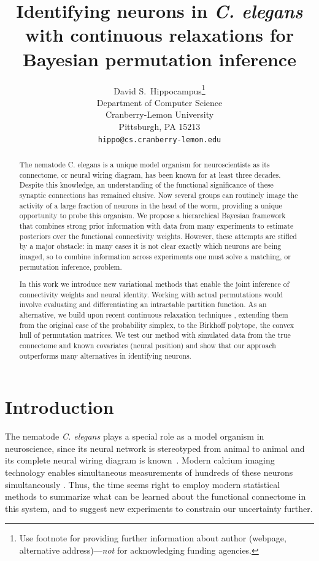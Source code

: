 \documentclass{article}
\title{Identifying neurons in \textit{C. elegans} with continuous relaxations for Bayesian permutation inference}
\author{
  David S.~Hippocampus\thanks{Use footnote for providing further
    information about author (webpage, alternative
    address)---\emph{not} for acknowledging funding agencies.} \\
  Department of Computer Science\\
  Cranberry-Lemon University\\
  Pittsburgh, PA 15213 \\
  \texttt{hippo@cs.cranberry-lemon.edu} \\
}
\begin{document}

\maketitle

\begin{abstract}
  The nematode C. elegans is a unique model organism for
  neuroscientists as its connectome, or neural wiring diagram, has
  been known for at least three decades. Despite this knowledge, an
  understanding of the functional significance of these synaptic
  connections has remained elusive. Now several groups can routinely
  image the activity of a large fraction of neurons in the head of the
  worm, providing a unique opportunity to probe this organism. We
  propose a hierarchical Bayesian framework that combines strong
  prior information with data from many experiments to estimate
  posteriors over the functional connectivity weights. However, these
  attempts are stifled by a major obstacle: in many cases it is not
  clear exactly which neurons are being imaged, so to combine
  information across experiments one must solve a matching, or
  permutation inference, problem.

  In this work we introduce new variational methods that enable the
  joint inference of connectivity weights and neural identity. Working
  with actual permutations would involve evaluating and
  differentiating an intractable partition function. As an
  alternative, we build upon recent continuous relaxation techniques
  \citep{Jang2016, Maddison2016}, extending them from the
  original case of the probability simplex, to the Birkhoff polytope,
  the convex hull of permutation matrices. We test our method with
  simulated data from the true connectome and known
  covariates (neural position) and show that our approach outperforms
  many alternatives in identifying neurons.
\end{abstract}



\section{Introduction}
The nematode \textit{C. elegans} plays a special role as a model organism
in neuroscience, since its neural network is stereotyped from animal to
animal and its complete neural wiring diagram is
known~\citep{varshney2011structural}.  
Modern calcium imaging technology enables simultaneous measurements of
hundreds of these neurons simultaneously \citep{Kato2015,
  nguyen2016whole}. Thus, the time seems right to employ modern statistical methods to summarize what can
be learned about the functional connectome in this system, and to suggest new experiments to constrain our uncertainty further.  
\end{document}
